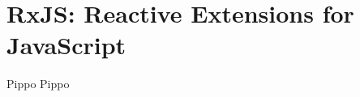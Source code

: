     \section{RxJS: Reactive Extensions for JavaScript}\label{sec:rxjs}
        \begin{frame}{\insertsectionhead}{\insertsubsectionhead}
            \begin{block}{Pippo}
                Pippo
            \end{block}
        \end{frame}
    \nocite{*}
    \section{\refname}\label{sec:ref}
    \begin{frame}[t,allowframebreaks]
        \frametitle{\insertsectionhead}
        \printbibliography
    \end{frame}

